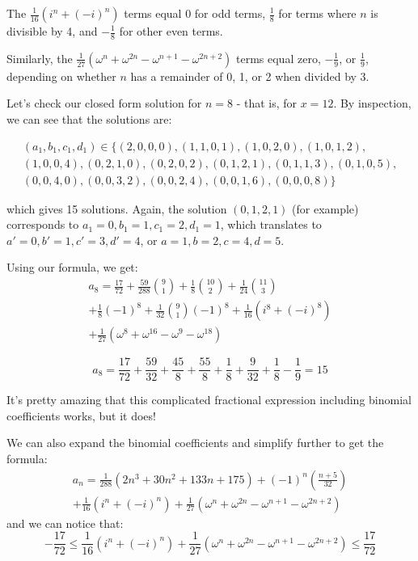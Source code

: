 \documentclass{article}
\begin{document}
The $\frac{1}{16}(i^n + (-i)^n)$ terms equal 0 for odd terms, $\frac{1}{8}$ for terms
where $n$ is divisible by 4, and $-\frac{1}{8}$ for other even terms.

Similarly, the $\frac{1}{27}\left(\omega^{n} + \omega^{2n} - \omega^{n+1} - \omega^{2n+2}\right)$
terms equal zero, $-\frac{1}{9}$, or $\frac{1}{9}$, depending on whether $n$ has a remainder of
0, 1, or 2 when divided by 3.

Let’s check our closed form solution for $n=8$ - that is, for $x=12$. By inspection, we can see
that the solutions are:

\begin{multline*}
(a_1,b_1,c_1,d_1) \in \{(2,0,0,0), (1,1,0,1), (1,0,2,0), (1,0,1,2),\\
(1,0,0,4), (0,2,1,0), (0,2,0,2), (0,1,2,1),(0,1,1,3), (0,1,0,5),\\
(0,0,4,0), (0,0,3,2), (0,0,2,4), (0,0,1,6), (0,0,0,8)\}
\end{multline*}

which gives 15 solutions. Again, the solution $(0,1,2,1)$ (for example) corresponds to
$a_1 = 0, b_1=1, c_1=2, d_1=1$, which translates to $a'=0, b'=1, c'=3, d'=4$, or $a=1, b=2, c=4, d=5$.

Using our formula, we get:
\begin{multline*}
	a_8 = \frac{17}{72} + \frac{59}{288}\binom{9}{1} + \frac{1}{8}\binom{10}{2} + \frac{1}{24}\binom{11}{3} \\
	+ \frac{1}{8}(-1)^8 + \frac{1}{32}\binom{9}{1}(-1)^8 + \frac{1}{16}(i^8 + (-i)^8) \\
	+ \frac{1}{27}\left(\omega^{8} + \omega^{16} - \omega^{9} - \omega^{18}\right)
\end{multline*}

\[a_8 = \frac{17}{72} + \frac{59}{32} + \frac{45}{8} + \frac{55}{8} + \frac{1}{8} + \frac{9}{32} + \frac{1}{8} - \frac{1}{9} = 15 \]

It’s pretty amazing that this complicated fractional expression including binomial
coefficients works, but it does!

We can also expand the binomial coefficients and simplify further to get the formula:
\begin{multline*}
	a_n = \frac{1}{288}(2n^3 + 30n^2 + 133n + 175) + (-1)^n(\frac{n+5}{32}) \\
	+ \frac{1}{16}(i^n + (-i)^n) + \frac{1}{27}\left(\omega^{n} + \omega^{2n} - \omega^{n+1} - \omega^{2n+2}\right)
\end{multline*}
and we can notice that:
\[
	-\frac{17}{72} \leq
	\frac{1}{16}(i^n + (-i)^n) + \frac{1}{27}\left(\omega^{n} + \omega^{2n} - \omega^{n+1} - \omega^{2n+2}\right)
	\leq \frac{17}{72}
\]
\end{document}
